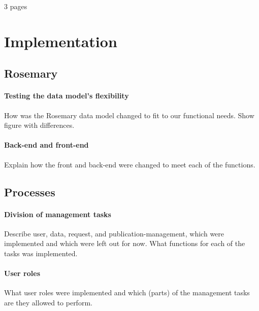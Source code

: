 \newline

3 pages

\section{Implementation}

\subsection{Rosemary}
\paragraph{Testing the data model's flexibility}
How was the Rosemary data model changed to fit to our functional needs.
Show figure with differences.
\paragraph{Back-end and front-end}
Explain how the front and back-end were changed to meet each of the functions.

\subsection{Processes}
\paragraph{Division of management tasks}
Describe user, data, request, and publication-management, which were implemented and which were left out for now.
What functions for each of the tasks was implemented.
\paragraph{User roles}
What user roles were implemented and which (parts) of the management tasks are they allowed to perform.